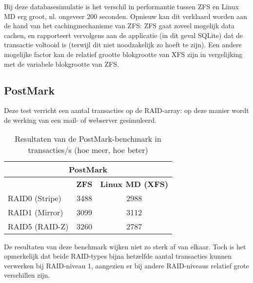 Bij deze databasesimulatie is het verschil in performantie tussen ZFS en Linux MD erg groot, nl. ongeveer 200 seconden. Opnieuw kan dit verklaard worden aan de hand van het cachingmechanisme van ZFS: ZFS gaat zoveel mogelijk data cachen, en rapporteert vervolgens aan de applicatie (in dit geval SQLite) dat de transactie voltooid is (terwijl dit niet noodzakelijk zo hoeft te zijn). Een andere mogelijke factor kan de relatief grootte blokgrootte van XFS zijn in vergelijking met de variabele blokgrootte van ZFS.

\subsection{PostMark}

Deze test verricht een aantal transacties op de RAID-array: op deze manier wordt de werking van een mail- of webserver gesimuleerd.

\begin{table}[h]
  \centering
  \begin{tabular}{l || c | c }
    \hline
    \multicolumn{3}{c}{\textbf{PostMark}} \\
    \hline
    & \textbf{ZFS} & \textbf{Linux MD (XFS)} \\
    \hline
    RAID0 (Stripe) & 3488 & 2988 \\
    RAID1 (Mirror) & 3099 & 3112 \\
    RAID5 (RAID-Z) & 3260 & 2787 \\
  \end{tabular}
  \caption{Resultaten van de PostMark-benchmark in transacties/s (hoe meer, hoe beter)}
  \label{tab:results_postmark}
\end{table}

De resultaten van deze benchmark wijken niet zo sterk af van elkaar. Toch is het opmerkelijk dat beide RAID-types bijna hetzelfde aantal transacties kunnen verwerken bij RAID-niveau 1, aangezien er bij andere RAID-niveaus relatief grote verschillen zijn.
